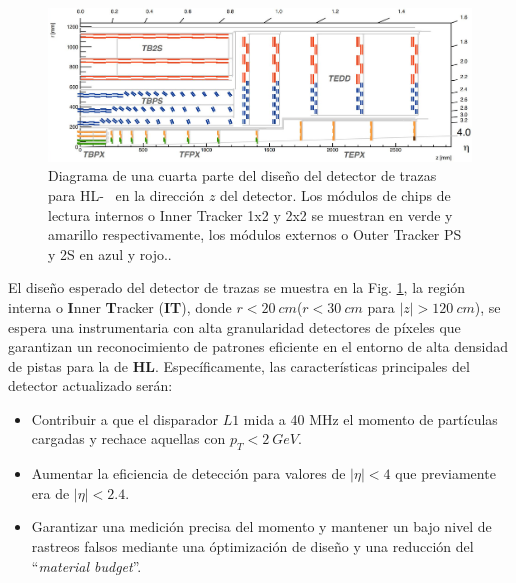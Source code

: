 \begin{figure}[!h]
\centering
\includegraphics[width=.95\textwidth]{Cap2/imagenes/track.png}
\caption[Diagrama de una cuarta parte del diseño del detector de trazas \CMS ~ para \LHC ~ en la dirección $z$ del mismo. Los módulos de chips de lectura internos o Inner Tracker 1x2 y 2x2 se muestran en verde y amarillo respectivamente, los módulos externos o Outer Tracker PS y 2S en azul y rojo.]{Diagrama de una cuarta parte del diseño del detector de trazas \CMS ~ para HL-\LHC ~ en la dirección $z$ del detector. Los módulos de chips de lectura internos o Inner Tracker 1x2 y 2x2 se muestran en verde y amarillo respectivamente, los módulos externos o Outer Tracker PS y 2S en azul y rojo.\footnotemark.}
\label{track}
\end{figure}



El diseño esperado del detector de trazas se muestra en la Fig. \ref{track}, la región interna o \textbf{I}nner \textbf{T}racker (\textbf{IT}), donde $r < 20 ~ cm$($r < 30 ~ cm$ para $|z|> 120 ~ cm$), se espera una instrumentaria con alta granularidad detectores de píxeles que garantizan un reconocimiento de patrones eficiente en el entorno de alta densidad de pistas para la de \textbf{HL}. %
Específicamente, las características principales del detector actualizado serán:
\begin{itemize}
\item Contribuir a que el disparador $L1$ mida a 40 MHz el momento de partículas cargadas y rechace aquellas con $p_T < 2 ~ GeV$.
\item Aumentar la eficiencia de detección para valores de $|\eta| < 4$ que previamente era de $|\eta| < 2.4$. 
\item Garantizar una medición precisa del momento y mantener un bajo nivel de rastreos falsos mediante una óptimización de diseño y una reducción del ``\textit{material budget}''.
\end{itemize}



